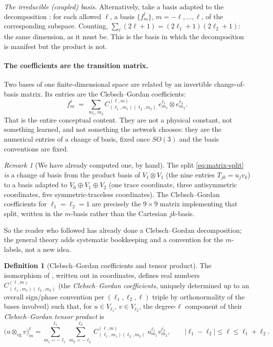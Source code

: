 \documentclass[11pt,a4paper]{report}
\theoremstyle{definition}
\newtheorem{definition}[definition]{Definition}
\theoremstyle{remark}
\newtheorem{remark}[remark]{Remark}
\begin{document}
\emph{The irreducible (coupled) basis.} Alternatively, take a basis adapted
to the decomposition : for each allowed $\ell$, a
basis $\{f^{\ell}_{m}\}$, $m=-\ell,\dots,\ell$, of the corresponding
subspace. Counting, $\sum_\ell(2\ell+1)=(2\ell_1+1)(2\ell_2+1)$: the same
dimension, as it must be. This is the basis in which the decomposition is
manifest but the product is not.

\paragraph{The coefficients are the transition matrix.} Two bases of one
finite-dimensional space are related by an invertible change-of-basis
matrix. Its entries are the Clebsch--Gordan coefficients:
\[
f^{\ell}_{m}
\;=\;
\sum_{m_1,m_2} C^{(\ell,m)}_{(\ell_1,m_1)(\ell_2,m_2)}\;
e^{\ell_1}_{m_1}\otimes e^{\ell_2}_{m_2} .
\]
That is the entire conceptual content. They are not a physical constant, not
something learned, and not something the network chooses: they are the
numerical entries of a change of basis, fixed once $SO(3)$ and the basis
conventions are fixed.

\begin{remark}[We have already computed one, by hand]
\label{rem:cg-already-done}
The split \eqref{eq:matrix-split} \emph{is} a change of basis from the
product basis of $V_1\otimes V_1$ (the nine entries $T_{jk}=u_jv_k$) to a
basis adapted to $V_0\oplus V_1\oplus V_2$ (one trace coordinate, three
antisymmetric coordinates, five symmetric-traceless coordinates). The
Clebsch--Gordan coefficients for $\ell_1=\ell_2=1$ are precisely the
$9\times9$ matrix implementing that split, written in the $m$-basis rather
than the Cartesian $jk$-basis.

So the reader who followed  has already done a
Clebsch--Gordan decomposition; the general theory adds systematic
bookkeeping and a convention for the $m$-labels, not a new idea.
\end{remark}

\begin{definition}[Clebsch--Gordan coefficients and tensor product]
\label{def:cg-scratch}
The isomorphism of , written out in coordinates,
defines real numbers $C^{(\ell,m)}_{(\ell_1,m_1)(\ell_2,m_2)}$ (the
\emph{Clebsch--Gordan coefficients}, uniquely determined up to an overall
sign/phase convention per $(\ell_1,\ell_2,\ell)$ triple by orthonormality of
the bases involved) such that, for $u\in V_{\ell_1}$, $v\in V_{\ell_2}$, the
degree-$\ell$ component of their \emph{Clebsch--Gordan tensor product} is
\begin{equation}
\label{eq:cg-scratch}
\bigl(u\otimes_{\mathrm{cg}}v\bigr)^\ell_m
=
\sum_{m_1=-\ell_1}^{\ell_1}\sum_{m_2=-\ell_2}^{\ell_2}
C^{(\ell,m)}_{(\ell_1,m_1)(\ell_2,m_2)}\;u^{\ell_1}_{m_1}v^{\ell_2}_{m_2},
\qquad
|\ell_1-\ell_2|\le\ell\le\ell_1+\ell_2 .
\end{equation}
\end{definition}
\end{document}
